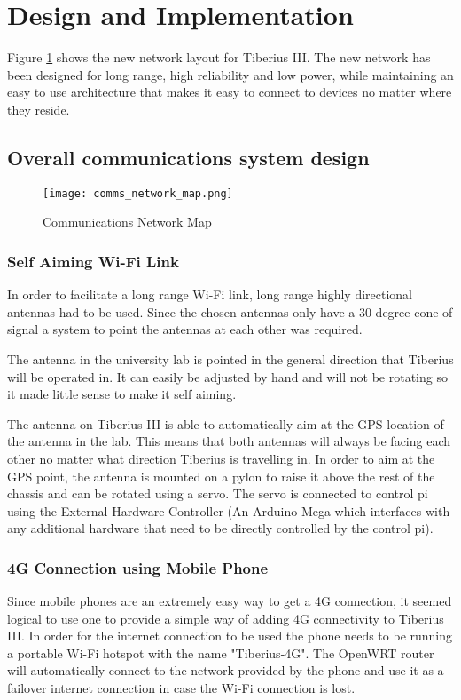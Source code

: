 \section{Design and Implementation}

Figure \ref{fig:comms_network_map} shows the new network layout for Tiberius III. The new network has been designed for long range, high reliability and low power, while maintaining an easy to use architecture that makes it easy to connect to devices no matter where they reside.
\subsection{Overall communications system design}
\begin{figure}[!htb]
\begin{center}
\texttt{[image: comms\_network\_map.png]}
\end{center}
\caption{Communications Network Map}
\label{fig:comms_network_map}
\end{figure}




\subsubsection{Self Aiming Wi-Fi Link}
In order to facilitate a long range Wi-Fi link, long range highly directional antennas had to be used. Since the chosen antennas only have a 30 degree cone of signal  a system to point the antennas at each other was required.

The antenna in the university lab is pointed in the general direction that Tiberius will be operated in. It can easily be adjusted by hand and will not be rotating so it made little sense to make it self aiming.

The antenna on Tiberius III is able to automatically aim at the GPS location of the antenna in the lab. This means that both antennas will always be facing each other no matter what direction Tiberius is travelling in. In order to aim at the GPS point, the antenna is mounted on a pylon to raise it above the rest of the chassis and can be rotated using a servo. The servo is connected to control pi using the External Hardware Controller (An Arduino Mega which interfaces with any additional hardware that need to be directly controlled by the control pi).

\subsubsection{4G Connection using Mobile Phone}
Since mobile phones are an extremely easy way to get a 4G connection, it seemed logical to use one to provide a simple way of adding 4G connectivity to Tiberius III. In order for the internet connection to be used the phone needs to be running a portable Wi-Fi hotspot with the name "Tiberius-4G". The OpenWRT router will automatically connect to the network provided by the phone and use it as a failover internet connection in case the Wi-Fi connection is lost.

